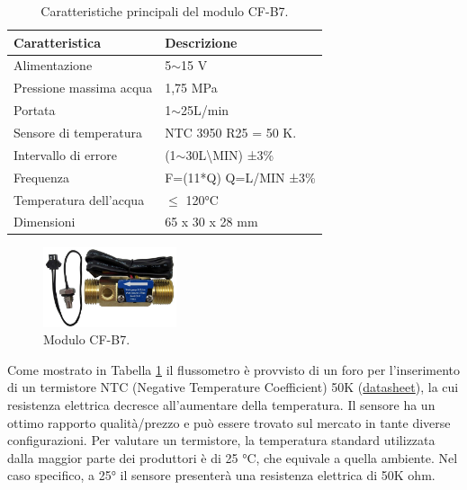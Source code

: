 \begin{table}[H]
    \centering
    \begin{tabular}{|l|l|}
    \hline
    \textbf{Caratteristica} & \textbf{Descrizione}                \\ \hline
    Alimentazione           & 5$\sim$15 V                         \\ \hline
    Pressione massima acqua & 1,75 MPa                            \\ \hline
    Portata                 & 1$\sim$25L/min                      \\ \hline
    Sensore di temperatura  & NTC 3950 R25 = 50 K.                \\ \hline
    Intervallo di errore    & (1$\sim$30L\textbackslash MIN) ±3\% \\ \hline
    Frequenza               & F=(11*Q) Q=L/MIN ±3\%                 \\ \hline
    Temperatura dell'acqua  & $\leq$ 120°C                              \\ \hline
    Dimensioni              & 65 x 30 x 28 mm                     \\ \hline
    \end{tabular}
    \caption{\label{tb-CF-B7-conn-schema}Caratteristiche principali del modulo CF-B7.}
\end{table}

\begin{figure}[H]
    \centering
    \includegraphics[width=0.35\textwidth]{images/sensors/cfb7.png}\hfill
    \caption{Modulo CF-B7.}
\end{figure}

Come mostrato in Tabella \ref*{tb-CF-B7-conn-schema} il flussometro è provvisto di un foro per l'inserimento di un termistore NTC (Negative Temperature Coefficient) 50K (\href{https://www.tme.eu/Document/34c96454d7432cb275d8954161fb18c2/NTCM-HP-50K-1.pdf}{datasheet}), la cui resistenza elettrica decresce all'aumentare della temperatura. Il sensore ha un ottimo rapporto qualità/prezzo e può essere trovato sul mercato in tante diverse configurazioni.
Per valutare un termistore, la temperatura standard utilizzata dalla maggior parte dei produttori è di 25 °C, che equivale a quella ambiente. Nel caso specifico, a 25° il sensore presenterà una resistenza elettrica di 50K ohm.

